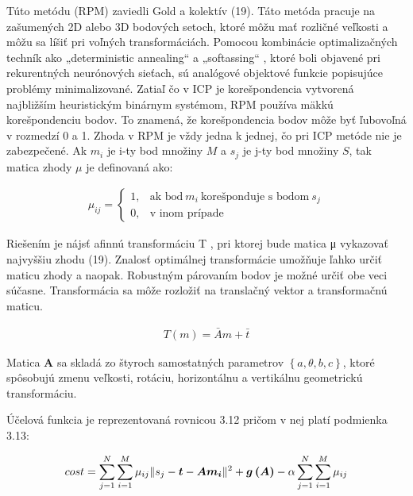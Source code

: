 Túto metódu (RPM) zaviedli Gold a kolektív (19). Táto metóda pracuje na zašumených 2D alebo 3D bodových setoch, ktoré môžu mať rozličné veľkosti a môžu sa líšiť pri voľných transformáciách. Pomocou kombinácie optimalizačných techník ako „deterministic annealing“ a „softassing“ , ktoré boli objavené pri rekurentných neurónových sieťach, sú analógové objektové funkcie popisujúce problémy minimalizované. Zatiaľ čo v ICP je korešpondencia vytvorená najbližším heuristickým binárnym systémom, RPM používa mäkkú korešpondenciu bodov. To znamená, že korešpondencia bodov môže byť ľubovoľná v rozmedzí 0 a 1. Zhoda v RPM je vždy jedna k jednej, čo pri ICP metóde nie je zabezpečené. Ak $m_i$ je i-ty bod množiny $M$ a $s_j$ je j-ty bod množiny $S$, tak matica zhody $\mu$ je definovaná ako:

\begin{equation}
\label{eq10}
\begin{aligned}
\mu_{ij}=
\begin{cases}
1, & \text{ak bod}\ m_i\ \text{korešponduje s bodom}\ s_j \\
0, & \text{v inom prípade}
\end{cases}
\end{aligned}
\end{equation}

Riešením je nájsť afinnú transformáciu T , pri ktorej bude matica μ vykazovať najvyššiu zhodu (19). Znalosť optimálnej transformácie umožňuje ľahko určiť maticu zhody a naopak. Robustným párovaním bodov je možné určiť obe veci súčasne. Transformácia sa môže rozložiť na translačný vektor a transformačnú maticu.

\begin{equation}
\label{eq11}
\begin{aligned}
T\left(m\right)=\bar{A}m+\bar{t}
\end{aligned}
\end{equation}

Matica \textbf{A} sa skladá zo štyroch samostatných parametrov $\left\lbrace a, \theta, b, c \right\rbrace$, ktoré spôsobujú zmenu veľkosti, rotáciu, horizontálnu a vertikálnu geometrickú transformáciu.

\noindent Účelová funkcia je reprezentovaná rovnicou 3.12 pričom v nej platí podmienka 3.13:

\begin{equation}
\label{eq12}
\begin{aligned}
cost=\sum_{j=1}^{N}\sum_{i=1}^{M} \mu_{ij} \Arrowvert s_j - \boldsymbol{t} - \boldsymbol{Am_i} \Arrowvert^2 + \boldsymbol{g\left(A\right)} -\alpha \sum_{j=1}^{N}\sum_{i=1}^{M} \mu_{ij}
\end{aligned}
\end{equation}

